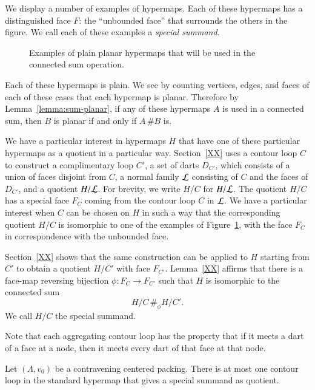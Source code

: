 We display a number of examples of  hypermaps. 
Each of these hypermaps has a distinguished face $F$:
the ``unbounded face'' that surrounds the others in the figure.
We call each of these examples a {\it special summand.}

\begin{figure}[htb]
  \centering
  \caption{Examples of plain planar hypermaps that will be used
   in the connected sum operation.}
  \label{fig:aggregates}
\end{figure}

Each of these hypermaps is plain.
We
see by counting vertices, edges, and faces 
of each of these cases that each hypermap
is planar.  Therefore by Lemma~\ref{lemma:sum-planar},
if any of these hypermaps $A$
is used in a connected sum, then 
$B$ is planar if and only if $A\,\# B$ is.

We have a particular interest in hypermaps $H$ that have one of these
particular hypermaps as a quotient in a particular way.  Section~\ref{XX}
uses a contour loop $C$ to construct a complimentary loop $C'$, a set
of darts $D_{C'}$, which consists of a union of faces disjoint from $C$,
a normal family ${\cal L}$ consisting of $C$ and the faces of $D_{C'}$,
and a quotient $H/{\cal L}$.  For brevity, we write
$H/C$ for $H/{\cal L}$.  The quotient $H/C$ has a special face
$F_C$ coming from the contour loop $C$ in $\cal L$.
We have a particular interest
when $C$ can be chosen on $H$ in such a way that the corresponding
quotient $H/C$ is isomorphic to 
one of the examples of Figure~\ref{fig:aggregates},
with the face $F_C$ in correspondence with the unbounded face.

Section~\ref{XX} shows that the same construction can be applied
to $H$ starting from $C'$ to obtain a quotient $H/C'$ with face $F_{C'}$. 
Lemma~\ref{XX} affirms that there is a face-map reversing bijection
$\phi:F_C \to F_{C'}$ such that  $H$ is isomorphic to the connected
sum $$H/C \,\#_\phi H/C'.$$  We call $H/C$ the special summand.

Note that each aggregating contour loop has the property that
if it meets a dart of a face at a node, then it meets every dart
of that face at that node.

\begin{lemma} Let $(\Lambda,v_0)$ be a contravening centered packing.  There
is at most one contour loop in the standard hypermap that gives a
special summand as quotient.
\end{lemma}

